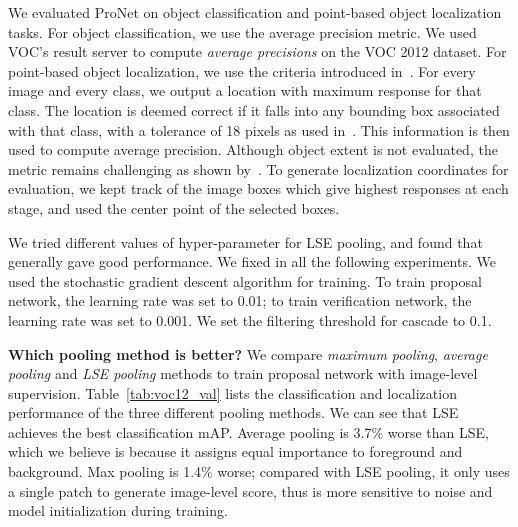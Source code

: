 \documentclass[10pt,twocolumn,letterpaper]{article}
\begin{document}
We evaluated ProNet on object classification and point-based object localization tasks. For object classification, we use the average precision metric. We used VOC's result server to compute \textit{average precisions} on the VOC 2012 dataset. For point-based object localization, we use the criteria introduced in~\cite{Oquab_2015_CVPR}. For every image and every class, we output a location with maximum response for that class. The location is deemed correct if it falls into any bounding box associated with that class, with a tolerance of 18 pixels as used in~\cite{Oquab_2015_CVPR}. This information is then used to compute average precision. Although object extent is not evaluated, the metric remains challenging as shown by~\cite{Oquab_2015_CVPR}. To generate localization coordinates for evaluation, we kept track of the image boxes which give highest responses at each stage, and used the center point of the selected boxes.

We tried different values of hyper-parameter  for LSE pooling, and found that  generally gave good performance. We fixed  in all the following experiments. We used the stochastic gradient descent algorithm for training. To train proposal network, the learning rate was set to 0.01; to train verification network, the learning rate was set to 0.001. We set the  filtering threshold for cascade to 0.1.

\textbf{Which pooling method is better?} We compare \textit{maximum pooling}, \textit{average pooling} and \textit{LSE pooling} methods to train proposal network with image-level supervision. Table~\ref{tab:voc12_val} lists the classification and localization performance of the three different pooling methods. We can see that LSE achieves the best classification mAP. Average pooling is 3.7\% worse than LSE, which we believe is because it assigns equal importance to foreground and background. Max pooling is 1.4\% worse; compared with LSE pooling, it only uses a single patch to generate image-level score, thus is more sensitive to noise and model initialization during training.
\end{document}
